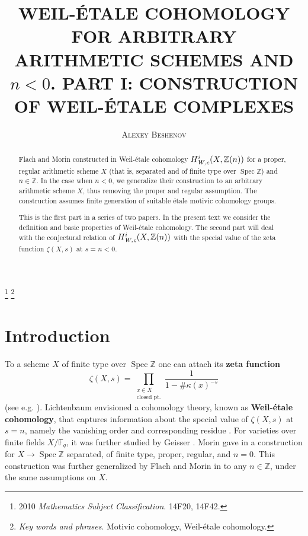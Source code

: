 \documentclass[leqno,12pt]{article}
\title{\uppercase{Weil-\'{e}tale cohomology for arbitrary arithmetic schemes and $n < 0$.
  Part I: Construction of Weil-\'{e}tale complexes}}
\author{\textsc{Alexey Beshenov}}
\date{}
\theoremstyle{plain}
\theoremstyle{definition}
\DeclareMathOperator{\Spec}{Spec}
\newcommand{\ZZ}{\mathbb{Z}}
\newcommand{\FF}{\mathbb{F}}
\newcommand{\Wc}{\text{\it W,c}}
\begin{document}
\maketitle

\footnote{ %
2010 \textit{Mathematics Subject Classification}.
14F20, 14F42.}
\footnote{ %
  \textit{Key words and phrases}.
  Motivic cohomology, Weil-\'{e}tale cohomology.}


\begin{abstract}
  Flach and Morin constructed in \cite{Flach-Morin-2018} Weil-\'{e}tale
  cohomology $H^i_\Wc (X, \ZZ(n))$ for a proper, regular arithmetic
  scheme $X$ (that is, separated and of finite type over $\Spec \ZZ$) and
  $n \in \ZZ$. In the case when $n < 0$, we generalize their construction to an
  arbitrary arithmetic scheme $X$, thus removing the proper and regular
  assumption. The construction assumes finite generation of suitable \'{e}tale
  motivic cohomology groups.

  This is the first part in a series of two papers. In the present text we
  consider the definition and basic properties of Weil-\'{e}tale cohomology. The
  second part will deal with the conjectural relation of $H^i_\Wc (X, \ZZ(n))$
  with the special value of the zeta function $\zeta (X,s)$ at $s = n < 0$.
\end{abstract}

\section{Introduction}

To a scheme $X$ of finite type over $\Spec \ZZ$ one can attach its
\textbf{zeta function}
$$\zeta (X,s) = \prod_{\substack{x \in X \\ \text{closed pt.}}} \frac{1}{1 - \#\kappa (x)^{-s}}$$
(see e.g. \cite{Serre-1965}). Lichtenbaum envisioned a cohomology theory, known
as \textbf{Weil-\'{e}tale cohomology}, that captures information about the special
value of $\zeta (X,s)$ at $s = n$, namely the vanishing order and corresponding
residue
\cite{Lichtenbaum-2005,Lichtenbaum-2009-number-rings,Lichtenbaum-2009-Euler-char}.
For varieties over finite fields $X/\FF_q$, it was further studied by Geisser
\cite{Geisser-2004,Geisser-2006,Geisser-2010-arithmetic-homology}.
Morin gave in \cite{Morin-2014} a construction for $X \to \Spec\ZZ$ separated,
of finite type, proper, regular, and $n = 0$. This construction was further
generalized by Flach and Morin in \cite{Flach-Morin-2018} to any $n \in \ZZ$,
under the same assumptions on $X$.
\end{document}
